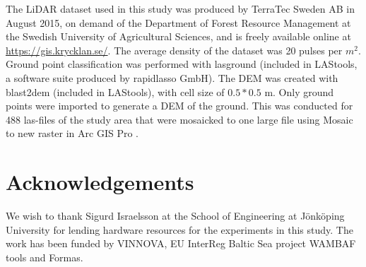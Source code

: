 \documentclass[]{interact}
\theoremstyle{plain}%
\theoremstyle{definition}
\theoremstyle{remark}
\begin{document}
\label{lidartodem}
The LiDAR dataset used in this study was produced by TerraTec Sweden AB in August 2015, on demand of the Department of Forest Resource Management at the Swedish University of Agricultural Sciences, and is freely available online at \href{https://gis.krycklan.se/}{https://gis.krycklan.se/}. The average density of the dataset was 20 pulses per $m^2$.  Ground point classification was performed with lasground (included in LAStools, a software suite produced by rapidlasso GmbH). The DEM was created with blast2dem (included in LAStools),  with cell size of $0.5*0.5$ m. Only ground points were imported  to generate a DEM of the ground. This was conducted for 488 las-files of the study area that were mosaicked to one large file using Mosaic to new raster in Arc GIS Pro \citep{EsriArcGisBook}.

\section*{Acknowledgements}
We wish to thank Sigurd Israelsson at the School of Engineering at J\"onk\"oping University for lending hardware resources for the experiments in this study. The work has been funded by VINNOVA, EU InterReg Baltic Sea project WAMBAF tools and Formas.



\label{references}



\end{document}
